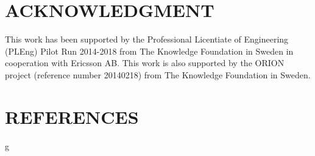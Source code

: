 \documentclass{article}
\begin{document}
\section*{ACKNOWLEDGMENT}
This work has been supported by the Professional Licentiate of Engineering (PLEng) Pilot Run 2014-2018 from The Knowledge Foundation in Sweden in cooperation with Ericsson AB. This work is also supported by the ORION project (reference number 20140218) from The Knowledge Foundation in Sweden.

\section*{REFERENCES}


g
\end{document}
